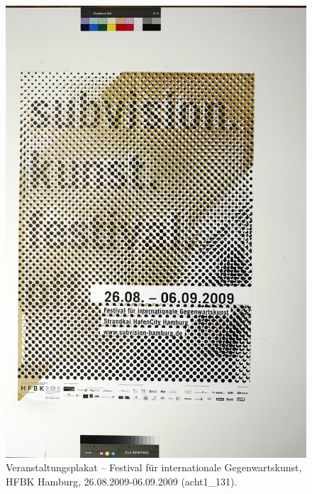 \documentclass[a4paper,12pt,ngerman]{article}
\begin{document}
\newpage
\begin{figure}[ht]
\includegraphics[width=\linewidth]{Abbildung_19_(acht1_131)}
\centering
\caption{Veranstaltungsplakat – Festival für internationale Gegenwartskunst, HFBK Hamburg, 26.08.2009-06.09.2009 (acht1\_131).}
\end{figure}
\end{document}
